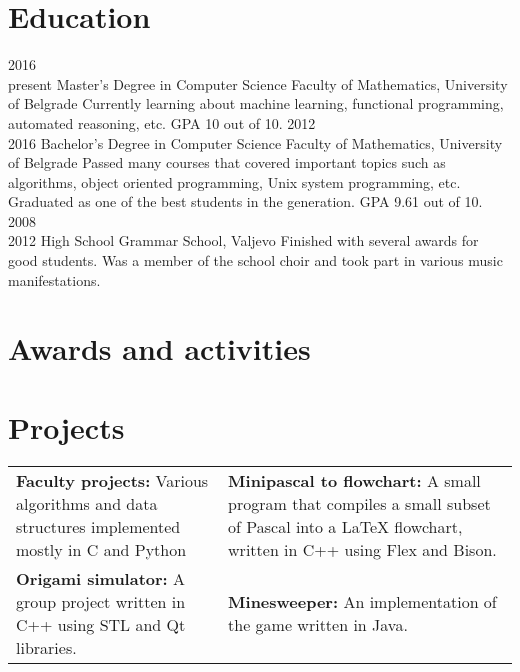 \documentclass{my_cv}
\begin{document}
\section{Education}
\begin{entrylist}
  \entry
    {2016~\textemdash \\present}
    {Master's Degree in Computer Science}
    {Faculty of Mathematics, University of Belgrade}
    {Currently learning about machine learning, functional programming, automated reasoning, etc. GPA 10 out of 10.}
  \entry
    {2012~\textemdash \\2016}
    {Bachelor's Degree in Computer Science}
    {Faculty of Mathematics, University of Belgrade}
    {Passed many courses that covered important topics such as algorithms, object oriented programming, Unix system programming, etc. Graduated as one of the best students in the generation. GPA 9.61 out of 10.}
  \entry
    {2008~\textemdash \\2012}
    {High School}
    {Grammar School, Valjevo}
    {Finished with several awards for good students. Was a member of the school choir and took part in various music manifestations.}
\end{entrylist}

\section{Awards and activities}
\bodyfont
\begin{aplist}
\end{aplist}

\section{Projects}
\setlength{\tabcolsep}{6pt}
\begin{tabularx}{\textwidth}{XX}
\textbf{Faculty projects:} Various algorithms and data structures implemented mostly in C and Python &
\textbf{Minipascal to flowchart:} A small program that compiles a small subset of Pascal into a LaTeX flowchart, written in C++ using Flex and Bison.\\
\textbf{Origami simulator:} A group project written in C++ using STL and Qt libraries. &
\textbf{Minesweeper:} An implementation of the game written in Java. \\
\end{tabularx}
\end{document}
